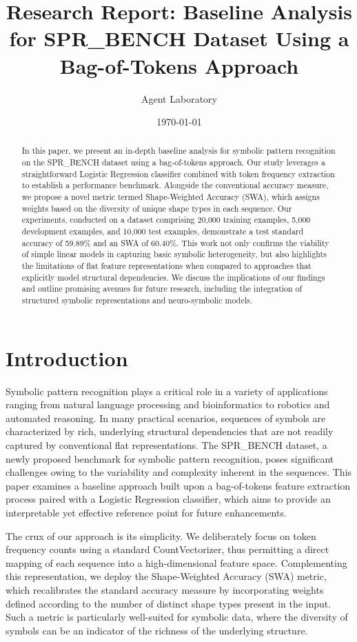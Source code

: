 \documentclass{article}
\title{Research Report: Baseline Analysis for SPR\_BENCH Dataset Using a Bag-of-Tokens Approach}
\author{Agent Laboratory}
\date{\today}
\begin{document}
\maketitle

\begin{abstract}
In this paper, we present an in‐depth baseline analysis for symbolic pattern recognition on the SPR\_BENCH dataset using a bag‐of-tokens approach. Our study leverages a straightforward Logistic Regression classifier combined with token frequency extraction to establish a performance benchmark. Alongside the conventional accuracy measure, we propose a novel metric termed Shape-Weighted Accuracy (SWA), which assigns weights based on the diversity of unique shape types in each sequence. Our experiments, conducted on a dataset comprising 20,000 training examples, 5,000 development examples, and 10,000 test examples, demonstrate a test standard accuracy of 59.89\% and an SWA of 60.40\%. This work not only confirms the viability of simple linear models in capturing basic symbolic heterogeneity, but also highlights the limitations of flat feature representations when compared to approaches that explicitly model structural dependencies. We discuss the implications of our findings and outline promising avenues for future research, including the integration of structured symbolic representations and neuro-symbolic models.
\end{abstract}

\section{Introduction}
Symbolic pattern recognition plays a critical role in a variety of applications ranging from natural language processing and bioinformatics to robotics and automated reasoning. In many practical scenarios, sequences of symbols are characterized by rich, underlying structural dependencies that are not readily captured by conventional flat representations. The SPR\_BENCH dataset, a newly proposed benchmark for symbolic pattern recognition, poses significant challenges owing to the variability and complexity inherent in the sequences. This paper examines a baseline approach built upon a bag-of-tokens feature extraction process paired with a Logistic Regression classifier, which aims to provide an interpretable yet effective reference point for future enhancements.

The crux of our approach is its simplicity. We deliberately focus on token frequency counts using a standard CountVectorizer, thus permitting a direct mapping of each sequence into a high-dimensional feature space. Complementing this representation, we deploy the Shape-Weighted Accuracy (SWA) metric, which recalibrates the standard accuracy measure by incorporating weights defined according to the number of distinct shape types present in the input. Such a metric is particularly well-suited for symbolic data, where the diversity of symbols can be an indicator of the richness of the underlying structure.
\end{document}
